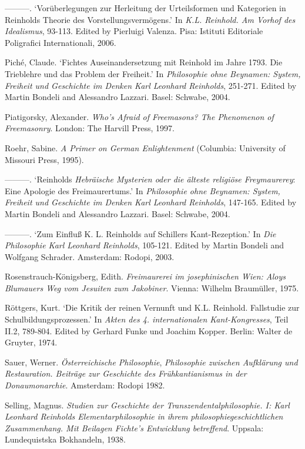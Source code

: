 {---}{---}{---}. `Vor\"{u}berlegungen zur Herleitung der Urteilsformen und Kategorien in Reinholds Theorie des Vorstellungsverm\"{o}gens.' In \textit{K.L. Reinhold. Am Vorhof des Idealismus}, 93{-}113. Edited by Pierluigi Valenza. Pisa: Istituti Editoriale Poligrafici Internationali, 2006. 

Pich\'{e}, Claude. `Fichtes Auseinandersetzung mit Reinhold im Jahre 1793. Die Trieblehre und das Problem der Freiheit.' In \textit{Philosophie ohne Beynamen: System, Freiheit und Geschichte im Denken Karl Leonhard Reinholds}, 251{-}271. Edited by Martin Bondeli and Alessandro Lazzari. Basel: Schwabe, 2004.

Piatigorsky, Alexander. \textit{Who's Afraid of Freemasons? The Phenomenon of Freemasonry}. London: The Harvill Press, 1997.

Roehr, Sabine. \textit{A Primer on German Enlightenment} (Columbia: University of Missouri Press, 1995).

{---}{---}{---}. `Reinholds \textit{Hebr\"{a}ische Mysterien oder die \"{a}lteste religi\"{o}se Freymaurerey}: Eine Apologie des Freimaurertums.' In \textit{Philosophie ohne Beynamen: System, Freiheit und Geschichte im Denken Karl Leonhard Reinholds}, 147{-}165. Edited by Martin Bondeli and Alessandro Lazzari. Basel: Schwabe, 2004.

{---}{---}{---}. `Zum Einflu\ss{} K. L. Reinholds auf Schillers Kant{-}Rezeption.' In \textit{Die Philosophie Karl Leonhard Reinholds}, 105{-}121. Edited by Martin Bondeli and Wolfgang Schrader. Amsterdam: Rodopi, 2003.

Rosenstrauch{-}K\"{o}nigsberg, Edith. \textit{Freimaurerei im josephinischen Wien: Aloys Blumauers Weg vom Jesuiten zum Jakobiner}. Vienna: Wilhelm Braum\"{u}ller, 1975.

R\"{o}ttgers, Kurt. `Die Kritik der reinen Vernunft und K.L. Reinhold. Fallstudie zur Schulbildungsprozessen.' In \textit{Akten des 4. internationalen Kant{-}Kongresses}, Teil II.2, 789{-}804. Edited by Gerhard Funke und Joachim Kopper. Berlin: Walter de Gruyter, 1974.

Sauer, Werner. \textit{\"{O}sterreichische Philosophie},\textit{ Philosophie zwischen Aufkl\"{a}rung und Restauration. Beitr\"{a}ge zur Geschichte des Fr\"{u}hkantianismus in der Donaumonarchie}. Amsterdam: Rodopi 1982.

Selling, Magnus.\textit{ Studien zur Geschichte der Transzendentalphilosophie. I: Karl Leonhard Reinholds Elementarphilosophie in ihrem philosophiegeschichtlichen Zusammenhang. Mit Beilagen Fichte's Entwicklung betreffend}. Uppsala: Lundequistska Bokhandeln, 1938.

